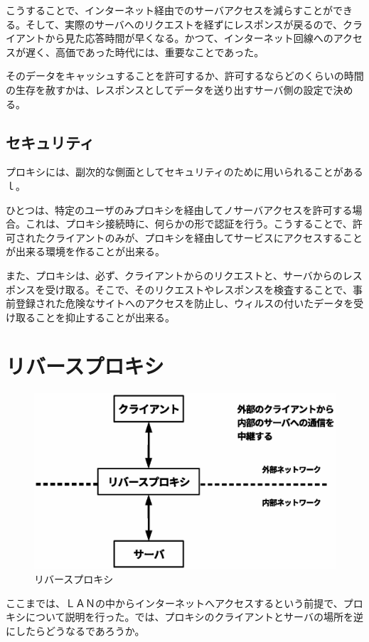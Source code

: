 こうすることで、インターネット経由でのサーバアクセスを減らすことができる。そして、実際のサーバへのリクエストを経ずにレスポンスが戻るので、クライアントから見た応答時間が早くなる。かつて、インターネット回線へのアクセスが遅く、高価であった時代には、重要なことであった。

そのデータをキャッシュすることを許可するか、許可するならどのくらいの時間の生存を赦すかは、レスポンスとしてデータを送り出すサーバ側の設定で決める。

\subsection{セキュリティ}
プロキシには、副次的な側面としてセキュリティのために用いられることがあるｌ。

ひとつは、特定のユーザのみプロキシを経由してノサーバアクセスを許可する場合。これは、プロキシ接続時に、何らかの形で認証を行う。こうすることで、許可されたクライアントのみが、プロキシを経由してサービスにアクセスすることが出来る環境を作ることが出来る。

また、プロキシは、必ず、クライアントからのリクエストと、サーバからのレスポンスを受け取る。そこで、そのリクエストやレスポンスを検査することで、事前登録された危険なサイトへのアクセスを防止し、ウィルスの付いたデータを受け取ることを抑止することが出来る。

\section{リバースプロキシ}

\begin{figure}[htbp]
	\includegraphics[width=12cm,clip]{draw/fig6.eps}
	\caption{リバースプロキシ}
	\label{fig:reverse-proxy}
\end{figure}

ここまでは、ＬＡＮの中からインターネットへアクセスするという前提で、プロキシについて説明を行った。では、プロキシのクライアントとサーバの場所を逆にしたらどうなるであろうか。

